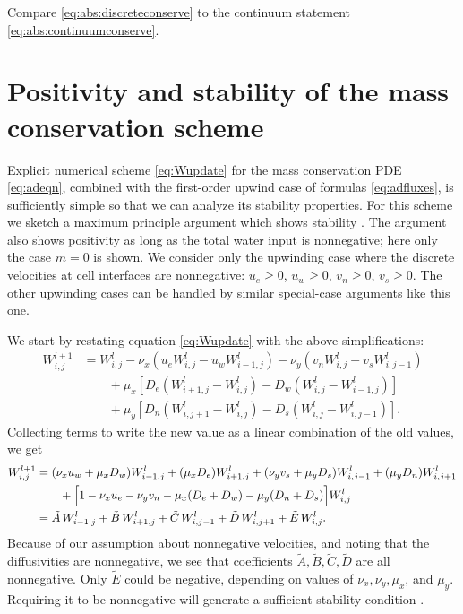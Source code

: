 \documentclass[11pt,final]{amsart}
\newcommand{\Wlij}{W^l_{i,j}}
\begin{document}
\begin{enumerate}
Compare \eqref{eq:abs:discreteconserve} to the continuum statement \eqref{eq:abs:continuumconserve}.
\end{enumerate}


\section{Positivity and stability of the mass conservation scheme} \label{app:positivestable}

Explicit numerical scheme \eqref{eq:Wupdate} for the mass conservation PDE \eqref{eq:adeqn}, combined with the first-order upwind case of formulas \eqref{eq:adfluxes}, is sufficiently simple so that we can analyze its stability properties.  For this scheme we sketch a maximum principle argument which shows stability \citep{MortonMayers}.  The argument also shows positivity \citep{HundsdorferVerwer2010} as long as the total water input is nonnegative; here only the case $m = 0$ is shown.  We consider only the upwinding case where the discrete velocities at cell interfaces are nonnegative: $u_e\ge 0$, $u_w\ge 0$, $v_n\ge 0$, $v_s\ge 0$.  The other upwinding cases can be handled by similar special-case arguments like this one.

We start by restating equation \eqref{eq:Wupdate} with the above simplifications:
\begin{align*}
 W_{i,j}^{l+1} &= \Wlij - \nu_x \left(u_e \Wlij - u_w W_{i-1,j}^l\right) - \nu_y \left(v_n \Wlij - v_s W_{i,j-1}^l\right)  \\
      &\qquad + \mu_x \left[D_e \left(W_{i+1,j}^l - \Wlij\right) - D_w \left(\Wlij - W_{i-1,j}^l\right)\right]  \\
      &\qquad + \mu_y \left[D_n \left(W_{i,j+1}^l - \Wlij\right) - D_s \left(\Wlij - W_{i,j-1}^l\right)\right].
\end{align*}
Collecting terms to write the new value as a linear combination of the old values, we get
\begin{align}
 W_{i,j}^{l+1} &= (\nu_x u_w + \mu_x D_w) W_{i-1,j}^l + (\mu_x D_e) W_{i+1,j}^l + (\nu_y v_s + \mu_y D_s) W_{i,j-1}^l + (\mu_y D_n) W_{i,j+1}^l  \notag \\
      &\qquad + \Big[1 - \nu_x u_e - \nu_y v_n - \mu_x (D_e + D_w) - \mu_y (D_n + D_s)\Big] \Wlij \notag \\
  &= \tilde A\, W_{i-1,j}^l + \tilde B\, W_{i+1,j}^l + \tilde C\, W_{i,j-1}^l + \tilde D\, W_{i,j+1}^l + \tilde E\, \Wlij. \label{eq:lincomb}
\end{align}
Because of our assumption about nonnegative velocities, and noting that the diffusivities are nonnegative, we see that coefficients $\tilde A,\tilde B,\tilde C,\tilde D$ are all nonnegative.  Only $\tilde E$ could be negative, depending on values of $\nu_x, \nu_y, \mu_x$, and $\mu_y$.  Requiring it to be nonnegative will generate a sufficient stability condition \citep{MortonMayers}.
\end{document}
